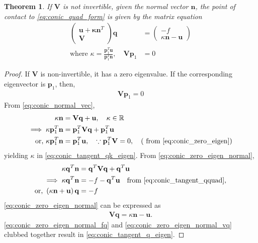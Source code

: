 \documentclass[]{interact}
\theoremstyle{plain}%
\newtheorem{theorem}{Theorem}[section]
\theoremstyle{definition}
\theoremstyle{remark}
\providecommand{\brak}[1]{\ensuremath{\left(#1\right)}}
\let\vec\mathbf
\begin{document}
\begin{theorem}
  If $\vec{V}$ is not invertible,  given the normal vector $\vec{n}$, the point of contact to \eqref{eq:conic_quad_form} is given by the matrix equation
\begin{align}
\label{eq:conic_tangent_q_eigen}
\begin{pmatrix}
\vec{u+\kappa \vec{n}}^T \\ \vec{V}
\end{pmatrix}
\vec{q} &= 
\begin{pmatrix}
-f
\\
\kappa\vec{n}-\vec{u}
\end{pmatrix}
\\
\text{where }  \kappa = \frac{\vec{p}_1^T\vec{u}}{\vec{p}_1^T\vec{n}}, \quad \vec{V}\vec{p}_1 &= 0
\label{eq:conic_tangent_qk_eigen}
\end{align}

\end{theorem}
\begin{proof}
  If $\vec{V}$ is non-invertible, it has a zero eigenvalue.  If the corresponding eigenvector is $\vec{p}_1$, then,
\begin{align}
\vec{V}\vec{p}_1 = 0
\label{eq:conic_zero_eigen}
\end{align}
From \eqref{eq:conic_normal_vec},
\begin{align}
\label{eq:conic_zero_eigen_normal}
\kappa \vec{n} &= \vec{V} \vec{q}+\vec{u}, \quad \kappa \in \mathbb{R}
\\
\implies \kappa \vec{p}_1^T\vec{n} &= \vec{p}_1^T\vec{V} \vec{q}+\vec{p}_1^T\vec{u}
\\
\text{or, } \kappa \vec{p}_1^T\vec{n} &= \vec{p}_1^T\vec{u},  \quad \because \vec{p}_1^T \vec{V} = 0, 
\quad 
\brak{\text{ from } \eqref{eq:conic_zero_eigen}}
\end{align}
yielding $\kappa$ in \eqref{eq:conic_tangent_qk_eigen}. From \eqref{eq:conic_zero_eigen_normal},
\begin{align}
\kappa \vec{q}^T\vec{n} &= \vec{q}^T\vec{V} \vec{q}+\vec{q}^T\vec{u}
\\
\implies \kappa \vec{q}^T\vec{n} &= -f-\vec{q}^T\vec{u} \quad \text{from } \eqref{eq:conic_tangent_qquad},
\\
\text{or, } \brak{\kappa \vec{n}+\vec{u}}\vec{q} &= -f
\label{eq:conic_zero_eigen_normal_fq}
\end{align}
\eqref{eq:conic_zero_eigen_normal} can be expressed as
\begin{align}
\label{eq:conic_zero_eigen_normal_vq}
\vec{V} \vec{q} = \kappa \vec{n} - \vec{u}.
\end{align}
\eqref{eq:conic_zero_eigen_normal_fq} and \eqref{eq:conic_zero_eigen_normal_vq} clubbed together result in \eqref{eq:conic_tangent_q_eigen}.
\end{proof}
\end{document}
